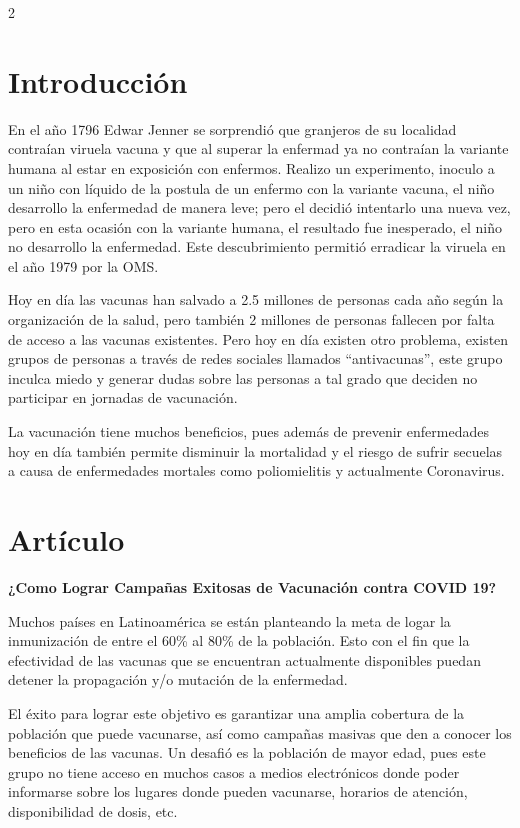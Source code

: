 \documentclass[12pt,spanish,Letterpaper,openany]{book}
\begin{document}
\begin {multicols}{2}

\hypertarget{introducciuxf3n}{%
\section{Introducción}\label{introducciuxf3n}}

En el año 1796 Edwar Jenner se sorprendió que granjeros de su localidad contraían viruela
vacuna y que al superar la enfermad ya no contraían la variante humana al estar en exposición
con enfermos. Realizo un experimento, inoculo a un niño con líquido de la postula de un
enfermo con la variante vacuna, el niño desarrollo la enfermedad de manera leve; pero el
decidió intentarlo una nueva vez, pero en esta ocasión con la variante humana, el resultado
fue inesperado, el niño no desarrollo la enfermedad. Este descubrimiento permitió erradicar
la viruela en el año 1979 por la OMS.

Hoy en día las vacunas han salvado a 2.5 millones de personas cada año según la organización
de la salud, pero también 2 millones de personas fallecen por falta de acceso a las vacunas
existentes. Pero hoy en día existen otro problema, existen grupos de personas a través de
redes sociales llamados ``antivacunas'', este grupo inculca miedo y generar dudas sobre las
personas a tal grado que deciden no participar en jornadas de vacunación.

La vacunación tiene muchos beneficios, pues además de prevenir enfermedades hoy en día
también permite disminuir la mortalidad y el riesgo de sufrir secuelas a causa de
enfermedades mortales como poliomielitis y actualmente Coronavirus.

\hypertarget{artuxedculo}{%
\section{Artículo}\label{artuxedculo}}

\textbf{¿Como Lograr Campañas Exitosas de Vacunación contra COVID 19?}

Muchos países en Latinoamérica se están planteando la meta de logar la inmunización de
entre el 60\% al 80\% de la población. Esto con el fin que la efectividad de las vacunas que se
encuentran actualmente disponibles puedan detener la propagación y/o mutación de la
enfermedad.

El éxito para lograr este objetivo es garantizar una amplia cobertura de la población que
puede vacunarse, así como campañas masivas que den a conocer los beneficios de las
vacunas. Un desafió es la población de mayor edad, pues este grupo no tiene acceso en
muchos casos a medios electrónicos donde poder informarse sobre los lugares donde pueden
vacunarse, horarios de atención, disponibilidad de dosis, etc.


\end{multicols}
\end{document}
